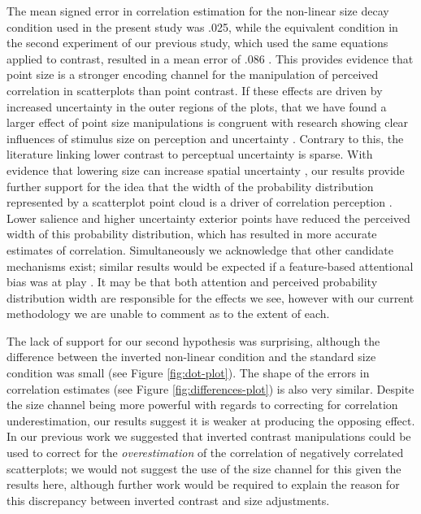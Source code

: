 \documentclass{vgtc}                          %
\begin{document}
The mean signed error in correlation estimation for the non-linear size decay condition used
in the present study was .025, while the equivalent condition in the second experiment
of our previous study, which used the same equations applied to contrast, resulted
in a mean error of .086 \cite{strain_2023}. This provides evidence that point
size is a stronger encoding channel for the manipulation of perceived correlation in
scatterplots than point contrast. If these effects
are driven by increased uncertainty in the outer regions of the plots,
that we have found a larger effect of point size manipulations is congruent
with research showing clear influences of stimulus size on perception and uncertainty
\cite{hong_2021, grice_1983, alais_2004}. Contrary to this, the literature linking
lower contrast to perceptual uncertainty is sparse. With evidence that lowering
size can increase spatial uncertainty \cite{alais_2004}, our results provide further
support for the idea that the width of the probability distribution represented by
a scatterplot point cloud is a driver of correlation perception \cite{meyer_1997, rensink_2017}.
Lower salience and higher uncertainty exterior points have reduced the perceived width
of this probability distribution, which has resulted in more accurate estimates
of correlation. Simultaneously we acknowledge that other candidate
mechanisms exist; similar results would be expected if a feature-based attentional
bias was at play \cite{hong_2021, sun_2016}. It may be that both attention and
perceived probability distribution width are responsible for the effects we see,
however with our current methodology we are unable to comment as to the extent of each.

The lack of support for our second hypothesis was surprising, although
the difference between the inverted non-linear condition and the standard size
condition was small (see Figure \ref{fig:dot-plot}). The shape of the errors
in correlation estimates (see Figure \ref{fig:differences-plot}) is also
very similar. Despite the size channel
being more powerful with regards to correcting
for correlation underestimation, our results suggest it is weaker at
producing the opposing effect. In our previous work we suggested that inverted contrast
manipulations could be used to correct for the \emph{overestimation} of the correlation
of negatively correlated scatterplots; we would not suggest the use of the size
channel for this given the results here, although further work would be required
to explain the reason for this discrepancy between inverted contrast and size adjustments.
\end{document}
